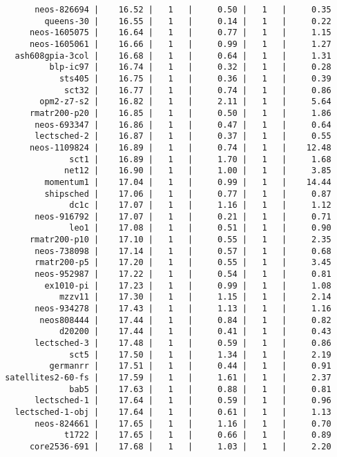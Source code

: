 \begin{lstlisting}
       neos-826694 |    16.52 |   1   |     0.50 |   1   |     0.35
         queens-30 |    16.55 |   1   |     0.14 |   1   |     0.22
      neos-1605075 |    16.64 |   1   |     0.77 |   1   |     1.15
      neos-1605061 |    16.66 |   1   |     0.99 |   1   |     1.27
   ash608gpia-3col |    16.68 |   1   |     0.64 |   1   |     1.31
          blp-ic97 |    16.74 |   1   |     0.32 |   1   |     0.28
            sts405 |    16.75 |   1   |     0.36 |   1   |     0.39
             sct32 |    16.77 |   1   |     0.74 |   1   |     0.86
        opm2-z7-s2 |    16.82 |   1   |     2.11 |   1   |     5.64
      rmatr200-p20 |    16.85 |   1   |     0.50 |   1   |     1.86
       neos-693347 |    16.86 |   1   |     0.47 |   1   |     0.64
       lectsched-2 |    16.87 |   1   |     0.37 |   1   |     0.55
      neos-1109824 |    16.89 |   1   |     0.74 |   1   |    12.48
              sct1 |    16.89 |   1   |     1.70 |   1   |     1.68
             net12 |    16.90 |   1   |     1.00 |   1   |     3.85
         momentum1 |    17.04 |   1   |     0.99 |   1   |    14.44
         shipsched |    17.06 |   1   |     0.77 |   1   |     0.87
              dc1c |    17.07 |   1   |     1.16 |   1   |     1.12
       neos-916792 |    17.07 |   1   |     0.21 |   1   |     0.71
              leo1 |    17.08 |   1   |     0.51 |   1   |     0.90
      rmatr200-p10 |    17.10 |   1   |     0.55 |   1   |     2.35
       neos-738098 |    17.14 |   1   |     0.57 |   1   |     0.68
       rmatr200-p5 |    17.20 |   1   |     0.55 |   1   |     3.45
       neos-952987 |    17.22 |   1   |     0.54 |   1   |     0.81
         ex1010-pi |    17.23 |   1   |     0.99 |   1   |     1.08
            mzzv11 |    17.30 |   1   |     1.15 |   1   |     2.14
       neos-934278 |    17.43 |   1   |     1.13 |   1   |     1.16
        neos808444 |    17.44 |   1   |     0.84 |   1   |     0.82
            d20200 |    17.44 |   1   |     0.41 |   1   |     0.43
       lectsched-3 |    17.48 |   1   |     0.59 |   1   |     0.86
              sct5 |    17.50 |   1   |     1.34 |   1   |     2.19
          germanrr |    17.51 |   1   |     0.44 |   1   |     0.91
 satellites2-60-fs |    17.59 |   1   |     1.61 |   1   |     2.37
              bab5 |    17.63 |   1   |     0.88 |   1   |     0.81
       lectsched-1 |    17.64 |   1   |     0.59 |   1   |     0.96
   lectsched-1-obj |    17.64 |   1   |     0.61 |   1   |     1.13
       neos-824661 |    17.65 |   1   |     1.16 |   1   |     0.70
             t1722 |    17.65 |   1   |     0.66 |   1   |     0.89
      core2536-691 |    17.68 |   1   |     1.03 |   1   |     2.20

\end{lstlisting}
